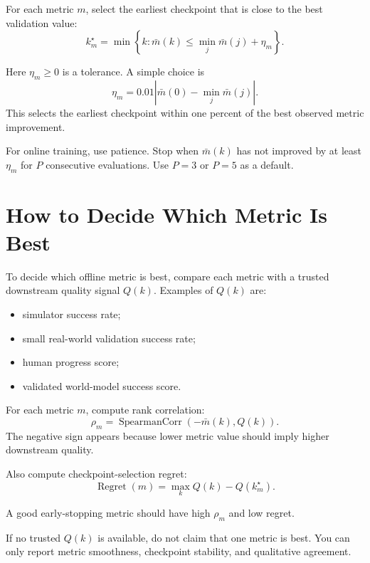 \documentclass[11pt]{article}
\begin{document}
For each metric $m$, select the earliest checkpoint that is close to the best validation value:
\begin{equation}
 k_m^{\star}
 =
 \min\left\{
 k:
 \bar{m}(k)
 \le
 \min_j \bar{m}(j)+\eta_m
 \right\}.
\end{equation}

Here $\eta_m\ge 0$ is a tolerance. A simple choice is
\begin{equation}
\eta_m = 0.01\left|\bar{m}(0)-\min_j \bar{m}(j)\right|.
\end{equation}
This selects the earliest checkpoint within one percent of the best observed metric improvement.

For online training, use patience. Stop when $\bar{m}(k)$ has not improved by at least $\eta_m$ for $P$ consecutive evaluations. Use $P=3$ or $P=5$ as a default.

\section{How to Decide Which Metric Is Best}

To decide which offline metric is best, compare each metric with a trusted downstream quality signal $Q(k)$. Examples of $Q(k)$ are:
\begin{itemize}
    \item simulator success rate;
    \item small real-world validation success rate;
    \item human progress score;
    \item validated world-model success score.
\end{itemize}

For each metric $m$, compute rank correlation:
\begin{equation}
\rho_m = \operatorname{SpearmanCorr}(-\bar{m}(k), Q(k)).
\end{equation}
The negative sign appears because lower metric value should imply higher downstream quality.

Also compute checkpoint-selection regret:
\begin{equation}
\operatorname{Regret}(m)
=
\max_k Q(k)-Q(k_m^{\star}).
\end{equation}

A good early-stopping metric should have high $\rho_m$ and low regret.

If no trusted $Q(k)$ is available, do not claim that one metric is best. You can only report metric smoothness, checkpoint stability, and qualitative agreement.
\end{document}
